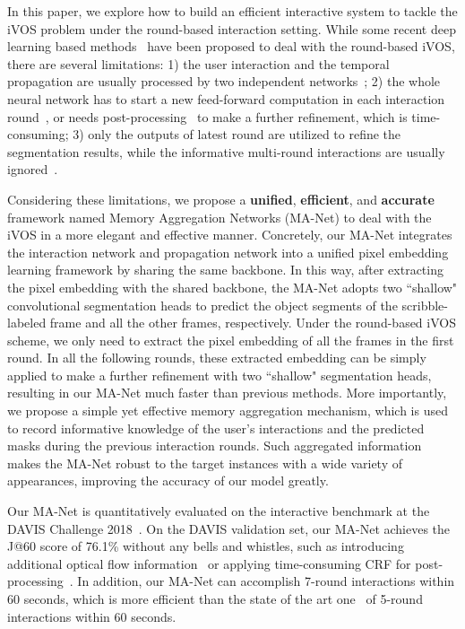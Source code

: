 \documentclass[10pt,twocolumn,letterpaper]{article}
\begin{document}
In this paper, we explore how to build an efficient interactive system to tackle the iVOS problem under the round-based interaction setting. 
While some recent deep learning based methods~\cite{oh2019fast,DAVIS2019-Interactive-2nd,DAVIS2018-Interactive-2nd,benard2017interactive,caelles20182018} have been proposed to deal with the round-based iVOS, there are several limitations: 1) the user interaction and the temporal propagation are usually processed by two independent networks~\cite{DAVIS2019-Interactive-2nd,benard2017interactive}; 2) the whole neural network has to start a new feed-forward computation in each interaction round~\cite{oh2019fast}, or needs post-processing~\cite{DAVIS2018-Interactive-2nd} to make a further refinement, which is time-consuming; 3) only the outputs of latest round are utilized to refine the segmentation results, while the informative multi-round interactions are usually ignored~\cite{DAVIS2019-Interactive-2nd}. 

Considering these limitations, we propose a \textbf{unified}, \textbf{efficient}, and \textbf{accurate} framework named Memory Aggregation Networks (MA-Net) to deal with the iVOS in a more elegant and effective manner. 
Concretely, our MA-Net integrates the interaction network and propagation network into a unified pixel embedding learning framework by sharing the same backbone. In this way, after extracting the pixel embedding with the shared backbone, the MA-Net adopts two ``shallow" convolutional segmentation heads to predict the object segments of the scribble-labeled frame and all the other frames, respectively. Under the round-based iVOS scheme, we only need to extract the pixel embedding of all the frames in the first round. In all the following rounds, these extracted embedding can be simply applied to make a further refinement with two ``shallow" segmentation heads, resulting in our MA-Net much faster than previous methods.
More importantly, we propose a simple yet effective memory aggregation mechanism, which is used to record informative knowledge of the user's interactions and the predicted masks during the previous interaction rounds. Such aggregated information makes the MA-Net robust to the target instances with a wide variety of appearances, improving the accuracy of our model greatly.



Our MA-Net is quantitatively evaluated on the interactive benchmark at the DAVIS Challenge 2018~\cite{caelles20182018}. On the DAVIS validation set, our MA-Net achieves the J@60 score of 76.1\% without any bells and whistles, such as introducing additional optical flow information~\cite{DAVIS2019-Interactive-2nd} or applying time-consuming CRF for post-processing~\cite{DAVIS2018-Interactive-2nd,krahenbuhl2013parameter}. In addition, our MA-Net can accomplish 7-round interactions within 60 seconds, which is more efficient than the state of the art one~\cite{oh2019fast} of 5-round interactions within 60 seconds.
\end{document}
